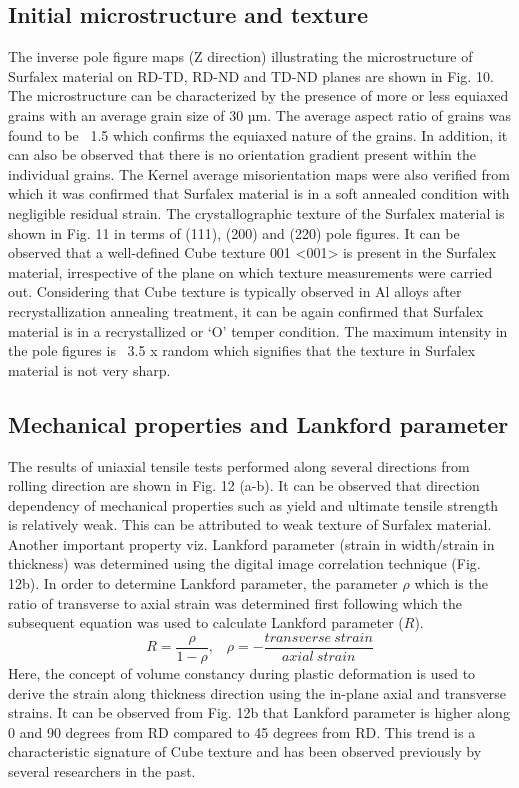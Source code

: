\documentclass[11pt]{article} %
\begin{document}
\subsection{Initial microstructure and texture}
The inverse pole figure maps (Z direction) illustrating the microstructure of Surfalex material on RD-TD, RD-ND and TD-ND planes are shown in Fig. 10. The microstructure can be characterized by the presence of more or less equiaxed grains with an average grain size of 30 µm. The average aspect ratio of grains was found to be ~1.5 which confirms the equiaxed nature of the grains. In addition, it can also be observed that there is no orientation gradient present within the individual grains. The Kernel average misorientation maps were also verified from which it was confirmed that Surfalex material is in a soft annealed condition with negligible residual strain. 
The crystallographic texture of the Surfalex material is shown in Fig. 11 in terms of (111), (200) and (220) pole figures. It can be observed that a well-defined Cube texture {001} <001> is present in the Surfalex material, irrespective of the plane on which texture measurements were carried out. Considering that Cube texture is typically observed in Al alloys after recrystallization annealing treatment, it can be again confirmed that Surfalex material is in a recrystallized or ‘O’ temper condition. The maximum intensity in the pole figures is ~3.5 x random which signifies that the texture in Surfalex material is not very sharp.  

\subsection{Mechanical properties and Lankford parameter}
The results of uniaxial tensile tests performed along several directions from rolling direction are shown in Fig. 12 (a-b). It can be observed that direction dependency of mechanical properties such as yield and ultimate tensile strength is relatively weak. This can be attributed to weak texture of Surfalex material. Another important property viz. Lankford parameter (strain in width/strain in thickness) was determined using the digital image correlation technique (Fig. 12b). In order to determine Lankford parameter, the parameter $\rho$ which is the ratio of transverse to axial strain was determined first following which the subsequent equation was used to calculate Lankford parameter ($R$).  
\begin{equation}
	R = \frac{\rho}{1-\rho}, \;\;\; \rho = -\frac{transverse\:strain}{axial\:strain}
\end{equation}
Here, the concept of volume constancy during plastic deformation is used to derive the strain along thickness direction using the in-plane axial and transverse strains. It can be observed from Fig. 12b that Lankford parameter is higher along 0 and 90 degrees from RD compared to 45 degrees from RD. This trend is a characteristic signature of Cube texture and has been observed previously by several researchers in the past\cite{Engler2015}.  
\end{document}
